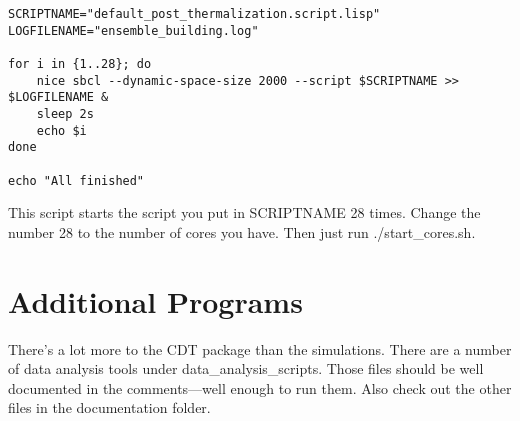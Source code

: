\documentclass{article}
\begin{document}
\begin{lstlisting}
SCRIPTNAME="default_post_thermalization.script.lisp"
LOGFILENAME="ensemble_building.log"

for i in {1..28}; do 
    nice sbcl --dynamic-space-size 2000 --script $SCRIPTNAME >> $LOGFILENAME &
    sleep 2s
    echo $i
done

echo "All finished"

\end{lstlisting}
This script starts the script you put in SCRIPTNAME 28 times. Change
the number 28 to the number of cores you have. Then just run
./start\_cores.sh.

\section{Additional Programs}

There's a lot more to the CDT package than the simulations. There are
a number of data analysis tools under data\_analysis\_scripts. Those
files should be well documented in the comments---well enough to run
them. Also check out the other files in the documentation folder.
\end{document}
